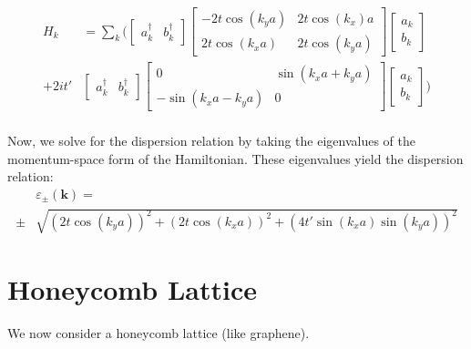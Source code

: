 \documentclass[10pt,a4paper]{article}\usepackage[]{graphicx}\usepackage[]{color}
\begin{document}
\begin{multicols}{2}
\begin{align*}
H_k &= \sum_k \Bigg(  \begin{bmatrix}
a^{\dagger}_{k} & b^{\dagger}_{k}
\end{bmatrix}\begin{bmatrix}
-2t\cos(k_y a) & 2t\cos(k_x) a\\
2t\cos(k_x a) & 2t\cos(k_y a)
\end{bmatrix}
\begin{bmatrix}
a_{k} \\ b_{k}
\end{bmatrix}
\\
+ 2it'&\begin{bmatrix}
a^{\dagger}_{k} & b^{\dagger}_{k}
\end{bmatrix}\begin{bmatrix}
0 & \sin(k_x a +k_ya)\\
-\sin(k_x a -k_ya) & 0
\end{bmatrix}
\begin{bmatrix}
a_{k} \\ b_{k}
\end{bmatrix}
\Bigg)\\
\end{align*}
\normalsize

Now, we solve for the dispersion relation by taking the eigenvalues of the momentum-space form of the Hamiltonian. These eigenvalues yield the dispersion relation:
\small
\begin{align*}
&\varepsilon_{\pm}(\mathbf{k}) = \\
\pm &\sqrt{\left(2t\cos(k_y a)\right)^2+\left(2t\cos(k_x a)\right)^2+\left(4t'\sin(k_xa)\sin(k_ya)\right)^2}
\end{align*}
\normalsize


\section{Honeycomb Lattice}
We now consider a honeycomb lattice (like graphene). 


\end{multicols}
\end{document}
